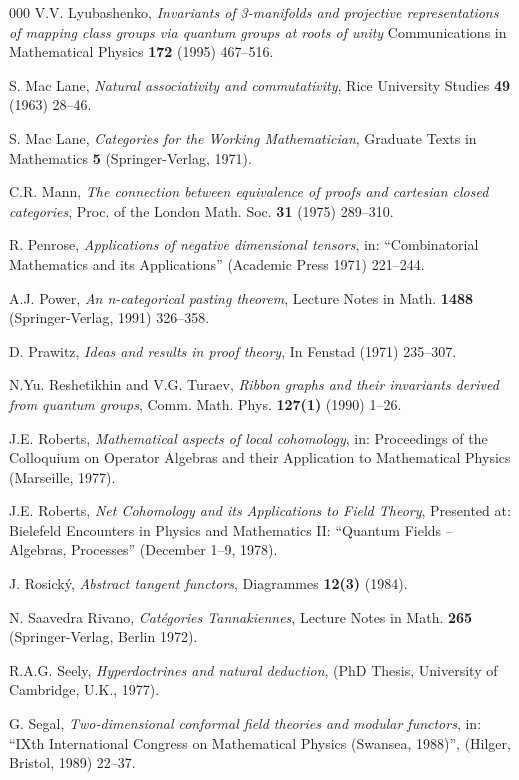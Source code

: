 \documentclass[a4paper,12pt]{article}
\theoremstyle{step}
\begin{document}
\begin{thebibliography}{000}
 V.V. Lyubashenko, 
\textit{Invariants of 3-manifolds and projective representations of mapping class groups 
via quantum groups at roots of unity} 
Communications in Mathematical Physics 
\textbf{172} (1995) 467--516.

 S. Mac Lane, 
\textit{Natural associativity and commutativity}, 
Rice University Studies \textbf{49} (1963) 28--46.

 S. Mac Lane, 
\textit{Categories for the Working Mathematician}, 
Graduate Texts in Mathematics \textbf{5} (Springer-Verlag, 1971).

 C.R. Mann,
\textit{The connection between equivalence of proofs and cartesian closed categories},
Proc. of the London Math. Soc. \textbf{31} (1975) 289--310.

 R. Penrose, 
\textit{Applications of negative dimensional tensors}, 
in: ``Combinatorial Mathematics and its Applications'' (Academic Press 1971) 221--244.

 A.J. Power, 
\textit{An n-categorical pasting theorem}, 
Lecture Notes in Math. \textbf{1488} (Springer-Verlag, 1991) 326--358.

 D. Prawitz,
\textit{Ideas and results in proof theory},
In Fenstad (1971) 235--307.

 N.Yu. Reshetikhin and V.G. Turaev, 
\textit{Ribbon graphs and their invariants derived from quantum groups}, 
Comm. Math. Phys. \textbf{127(1)} (1990) 1--26.

 J.E. Roberts, 
\textit{Mathematical aspects of local cohomology}, 
in: Proceedings of the Colloquium on Operator Algebras 
and their Application to Mathematical Physics (Marseille, 1977).

 J.E. Roberts, 
\textit{Net Cohomology and its Applications to Field Theory},
Presented at: Bielefeld Encounters in Physics and Mathematics II: 
``Quantum Fields -- Algebras, Processes'' (December 1--9, 1978).

 J. Rosick\'y, 
\textit{Abstract tangent functors}, 
Diagrammes \textbf{12(3)} (1984).

 N. Saavedra Rivano, \textit{Cat\'egories Tannakiennes}, 
Lecture Notes in Math. \textbf{265} (Springer-Verlag, Berlin 1972).

 R.A.G. Seely,
\textit{Hyperdoctrines and natural deduction},
(PhD Thesis, University of Cambridge, U.K., 1977).

 G. Segal,
\textit{Two-dimensional conformal field theories and modular functors}, 
in: ``IXth International Congress on Mathematical Physics (Swansea, 1988)'', 
(Hilger, Bristol, 1989) 22--37.


\end{thebibliography}
\end{document}
